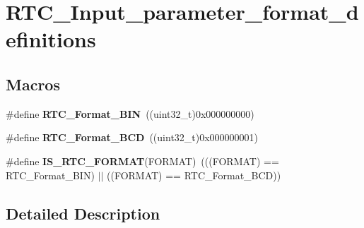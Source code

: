\hypertarget{group___r_t_c___input__parameter__format__definitions}{\section{R\-T\-C\-\_\-\-Input\-\_\-parameter\-\_\-format\-\_\-definitions}
\label{group___r_t_c___input__parameter__format__definitions}
}
\subsection*{Macros}
\begin{DoxyCompactItemize}
\item 
\hypertarget{group___r_t_c___input__parameter__format__definitions_gaa0d76a1ae008c8e3602e45a1d4675174}{\#define {\bfseries R\-T\-C\-\_\-\-Format\-\_\-\-B\-I\-N}~((uint32\-\_\-t)0x000000000)}\label{group___r_t_c___input__parameter__format__definitions_gaa0d76a1ae008c8e3602e45a1d4675174}

\item 
\hypertarget{group___r_t_c___input__parameter__format__definitions_gac40ea19c2fee09cf26beaa29140a771e}{\#define {\bfseries R\-T\-C\-\_\-\-Format\-\_\-\-B\-C\-D}~((uint32\-\_\-t)0x000000001)}\label{group___r_t_c___input__parameter__format__definitions_gac40ea19c2fee09cf26beaa29140a771e}

\item 
\hypertarget{group___r_t_c___input__parameter__format__definitions_ga05a1ca8558058d71322ccf1045b8fb1c}{\#define {\bfseries I\-S\-\_\-\-R\-T\-C\-\_\-\-F\-O\-R\-M\-A\-T}(F\-O\-R\-M\-A\-T)~(((F\-O\-R\-M\-A\-T) == R\-T\-C\-\_\-\-Format\-\_\-\-B\-I\-N) $|$$|$ ((F\-O\-R\-M\-A\-T) == R\-T\-C\-\_\-\-Format\-\_\-\-B\-C\-D))}\label{group___r_t_c___input__parameter__format__definitions_ga05a1ca8558058d71322ccf1045b8fb1c}

\end{DoxyCompactItemize}


\subsection{Detailed Description}
